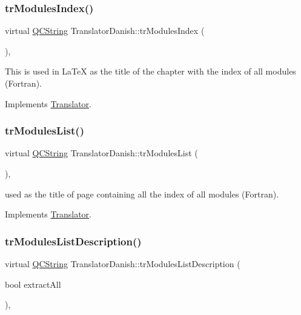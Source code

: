 \subsubsection{\texorpdfstring{trModulesIndex()}{trModulesIndex()}}
{\footnotesize\ttfamily virtual \mbox{\hyperlink{class_q_c_string}{Q\+C\+String}} Translator\+Danish\+::tr\+Modules\+Index (\begin{DoxyParamCaption}{ }\end{DoxyParamCaption})\hspace{0.3cm}{\ttfamily [inline]}, {\ttfamily [virtual]}}

This is used in La\+TeX as the title of the chapter with the index of all modules (Fortran). 

Implements \mbox{\hyperlink{class_translator}{Translator}}.

\mbox{\label{class_translator_danish_aa432303edf5024bd895f14e11d2a64eb}} 
\subsubsection{\texorpdfstring{trModulesList()}{trModulesList()}}
{\footnotesize\ttfamily virtual \mbox{\hyperlink{class_q_c_string}{Q\+C\+String}} Translator\+Danish\+::tr\+Modules\+List (\begin{DoxyParamCaption}{ }\end{DoxyParamCaption})\hspace{0.3cm}{\ttfamily [inline]}, {\ttfamily [virtual]}}

used as the title of page containing all the index of all modules (Fortran). 

Implements \mbox{\hyperlink{class_translator}{Translator}}.

\mbox{\label{class_translator_danish_a40b5a6104ed57a5f5495732972d9b863}} 
\subsubsection{\texorpdfstring{trModulesListDescription()}{trModulesListDescription()}}
{\footnotesize\ttfamily virtual \mbox{\hyperlink{class_q_c_string}{Q\+C\+String}} Translator\+Danish\+::tr\+Modules\+List\+Description (\begin{DoxyParamCaption}\item[{bool}]{extract\+All }\end{DoxyParamCaption})\hspace{0.3cm}{\ttfamily [inline]}, {\ttfamily [virtual]}}

